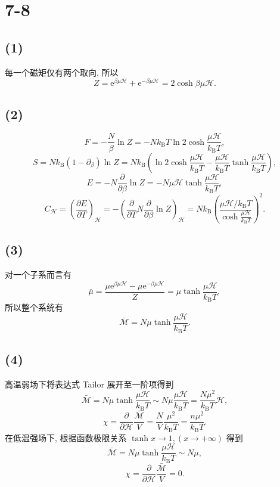 \documentclass[
    lang=cn,
    column=onecolumn
]{spArticle}
\begin{document}
    \section{7-8}
        \subsection{(1)}
            每一个磁矩仅有两个取向, 所以
            $$
            Z=\mathrm{e}^{\beta \mu \mathscr{H}}+\mathrm{e}^{-\beta \mu \mathscr{H}}=2\cosh \beta \mu \mathscr{H} .
            $$
        \subsection{(2)}
            $$
            F=-\frac{N}{\beta}\ln Z=-Nk_{\mathrm{B}}T\ln 2\cosh \frac{\mu \mathscr{H}}{k_{\mathrm{B}}T},
            $$
            $$
            S=Nk_{\mathrm{B}}\left( 1-\partial _{\beta} \right) \ln Z=Nk_{\mathrm{B}}\left( \ln 2\cosh \frac{\mu \mathscr{H}}{k_{\mathrm{B}}T}-\frac{\mu \mathscr{H}}{k_{\mathrm{B}}T}\tanh \frac{\mu \mathscr{H}}{k_{\mathrm{B}}T} \right) ,
            $$
            $$
            E=-N\frac{\partial}{\partial \beta}\ln Z=-N\mu \mathscr{H} \tanh \frac{\mu \mathscr{H}}{k_{\mathrm{B}}T},
            $$
            $$
            C_{\mathscr{H}}=\left( \frac{\partial E}{\partial T} \right) _{\mathscr{H}}=-\left( \frac{\partial}{\partial T}N\frac{\partial}{\partial \beta}\ln Z \right) _{\mathscr{H}}=Nk_{\mathrm{B}}\left( \frac{\mu \mathscr{H} /k_{\mathrm{B}}T}{\cosh \frac{\mu \mathscr{H}}{k_{\mathrm{B}}T}} \right) ^2.
            $$
        \subsection{(3)}
            对一个子系而言有
            $$
            \bar{\mu}=\frac{\mu \mathrm{e}^{\beta \mu \mathscr{H}}-\mu \mathrm{e}^{-\beta \mu \mathscr{H}}}{Z}=\mu \tanh \frac{\mu \mathscr{H}}{k_{\mathrm{B}}T},
            $$
            所以整个系统有
            $$
            \bar{\mathscr{M}}=N\mu \tanh \frac{\mu \mathscr{H}}{k_{\mathrm{B}}T}.
            $$
        \subsection{(4)}
            高温弱场下将表达式 Tailor 展开至一阶项得到
            $$
            \bar{\mathscr{M}}=N\mu \tanh \frac{\mu \mathscr{H}}{k_{\mathrm{B}}T}\sim N\mu \frac{\mu \mathscr{H}}{k_{\mathrm{B}}T}=\frac{N\mu ^2}{k_{\mathrm{B}}T}\mathscr{H},
            $$
            $$
            \chi =\frac{\partial}{\partial \mathscr{H}}\frac{\bar{\mathscr{M}}}{V}=\frac{N}{V}\frac{\mu ^2}{k_{\mathrm{B}}T}=\frac{n\mu ^2}{k_{\mathrm{B}}T}.
            $$
            在低温强场下, 根据函数极限关系 $\tanh x\rightarrow 1, \left( x\rightarrow +\infty \right)$ 得到
            $$
            \bar{\mathscr{M}}=N\mu \tanh \frac{\mu \mathscr{H}}{k_{\mathrm{B}}T}\sim N\mu ,
            $$
            $$
            \chi =\frac{\partial}{\partial \mathscr{H}}\frac{\bar{\mathscr{M}}}{V}=0.
            $$
\end{document}
